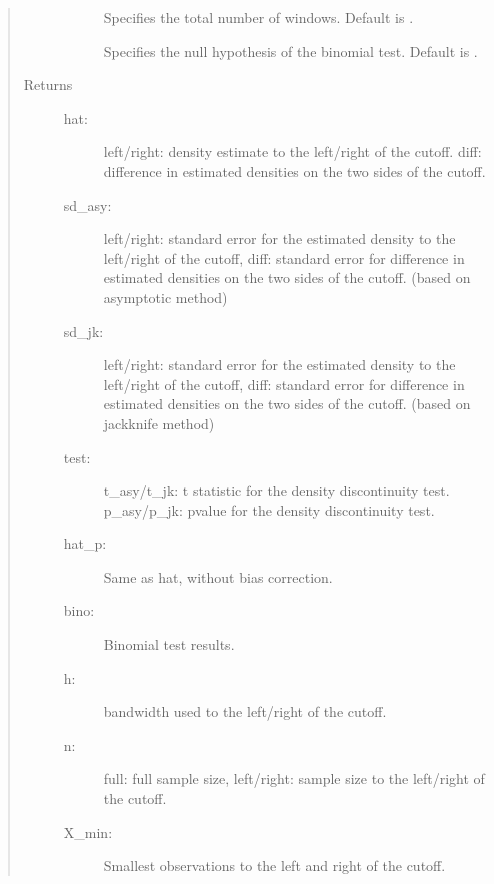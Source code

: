 \documentclass[letterpaper,10pt,english]{sphinxmanual}
\begin{document}
\begin{fulllineitems}
\begin{quote}
\begin{description}
\begin{description}
\item[{}] \leavevmode
\sphinxAtStartPar
Specifies the total number of windows. Default is .

\item[{}] \leavevmode
\sphinxAtStartPar
Specifies the null hypothesis of the binomial test. Default is .

\end{description}

\item[{Returns}] \leavevmode\begin{description}
\item[{hat:}] \leavevmode
\sphinxAtStartPar
left/right: density estimate to the left/right of the cutoff. diff: difference in estimated densities on the two sides of the cutoff.

\item[{sd\_asy:}] \leavevmode
\sphinxAtStartPar
left/right: standard error for the estimated density to the left/right of the cutoff, diff: standard error for difference in estimated densities on the two sides of the cutoff. (based on asymptotic method)

\item[{sd\_jk:}] \leavevmode
\sphinxAtStartPar
left/right: standard error for the estimated density to the left/right of the cutoff, diff: standard error for difference in estimated densities on the two sides of the cutoff. (based on jackknife method)

\item[{test:}] \leavevmode
\sphinxAtStartPar
t\_asy/t\_jk: t statistic for the density discontinuity test. p\_asy/p\_jk: p\sphinxhyphen{}value for the density discontinuity test.

\item[{hat\_p:}] \leavevmode
\sphinxAtStartPar
Same as hat, without bias correction.

\item[{bino:}] \leavevmode
\sphinxAtStartPar
Binomial test results.

\item[{h:}] \leavevmode
\sphinxAtStartPar
bandwidth used to the left/right of the cutoff.

\item[{n:}] \leavevmode
\sphinxAtStartPar
full: full sample size, left/right: sample size to the left/right of the cutoff.

\item[{X\_min:}] \leavevmode
\sphinxAtStartPar
Smallest observations to the left and right of the cutoff.


\end{description}
\end{description}
\end{quote}
\end{fulllineitems}
\end{document}
